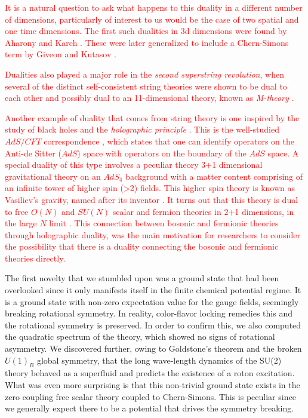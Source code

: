 \textcolor{red}{It is a natural question to ask what happens to this duality in a different number of dimensions, particularly of interest to us would be the case of two spatial and one time dimensions. The first such dualities in 3d dimensions were found by Aharony and Karch \cite{Aharony:1997gp, Karch:1997ux}. These were later generalized to include a Chern-Simons term by Giveon and Kutasov \cite{Giveon:2008zn}. \cite{Benini:2011mf, deBoer:1997kr}}

\textcolor{red}{Dualities also played a major role in the \textit{second superstring revolution}, when several of the distinct self-consistent string theories were shown to be dual to each other \cite{Sen:1994fa, Schwarz:1994xn, Sathiapalan:1986zb, Hull:1994ys} and possibly dual to an 11-dimensional theory, known as \textit{M-theory} \cite{Witten:1995ex}.}

\textcolor{red}{Another example of duality that comes from string theory is one inspired by the study of black holes and the \textit{holographic principle} \cite{Susskind:1994vu, tHooft:1993dmi}. This is the well-studied $AdS/CFT$ correspondence \cite{Aharony:1999ti, Maldacena:1997re}, which states that one can identify operators on the Anti-de Sitter ($AdS$) space with operators on the boundary of the $AdS$ space. A special duality of this type involves a peculiar theory 3+1 dimensional gravitational theory on an $AdS_4$ background with a matter content comprising of an infinite tower of higher spin (>2) fields. This higher spin theory is known as Vasiliev's gravity, named after its inventor \cite{Vasiliev:1992av}. It turns out that this theory is dual to free $O(N)$ and $SU(N)$ scalar and fermion theories in 2+1 dimensions, in the large $N$ limit \cite{Sezgin:2003pt, Klebanov:2002ja}. This connection between bosonic and fermionic theories through holographic duality, was the main motivation for researchers to consider the possibility that there is a duality connecting the bosonic and fermionic theories directly. }


The first novelty that we stumbled upon was a ground state that had been overlooked since it only manifests itself in the finite chemical potential regime. It is a ground state with non-zero expectation value for the gauge fields, seemingly breaking rotational symmetry. In reality, color-flavor locking remedies this and the rotational symmetry is preserved. In order to confirm this, we also computed the quadratic spectrum of the theory, which showed no signs of rotational asymmetry. We discovered further, owing to Goldstone's theorem and the broken $U(1)_B$ global symmetry, that the long wave-length dynamics of the SU(2) theory behaved as a superfluid and predicts the existence of a roton excitation. What was even more surprising is that this non-trivial ground state exists in the zero coupling free scalar theory coupled to Chern-Simons. This is peculiar since we generally expect there to be a potential that drives the symmetry breaking.

